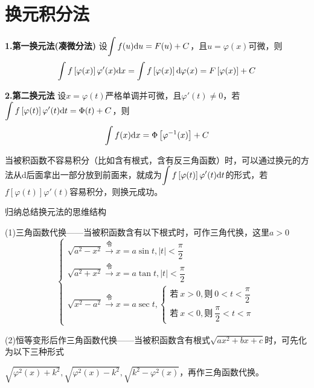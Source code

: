\section{换元积分法}
\textbf{1.第一换元法(凑微分法)} \quad 设$\displaystyle\int f(u)\mathrm{d} u=F(u)+C$，且$u=\varphi(x)$可微，则
\begin{equation}
    \int f\left[\varphi(x)\right]\varphi'(x)\mathrm{d} x=\int f\left[\varphi(x)\right]\mathrm{d}\varphi(x)=F\left[\varphi(x)\right]+C
    \nonumber
\end{equation}

\textbf{2.第二换元法} \quad 设$x=\varphi(t)$严格单调并可微，且$\varphi'(t)\neq0$，若$\displaystyle\int f\left[\varphi(t)\right]\varphi'(t)\mathrm{d} t=\Phi(t)+C$，则
\begin{equation}
    \int f(x)\mathrm{d} x=\Phi\left[\varphi^{-1}(x)\right]+C
    \nonumber
\end{equation}

当被积函数不容易积分（比如含有根式，含有反三角函数）时，可以通过换元的方法从d后面拿出一部分放到前面来，就成为$\displaystyle\int f\left[\varphi(t)\right]\varphi'(t)\mathrm{d} t$的形式，若$f\left[\varphi(t)\right]\varphi'(t)$容易积分，则换元成功。

归纳总结换元法的思维结构

(1)三角函数代换——当被积函数含有以下根式时，可作三角代换，这里$a>0$
\begin{equation}
    \begin{cases}
        \sqrt{a^2-x^2}\xrightarrow{\mbox{令}}x=a\sin t,\left|t\right|<\dfrac{\pi}{2} \\
        \sqrt{a^2+x^2}\xrightarrow{\mbox{令}}x=a\tan t,\left|t\right|<\dfrac{\pi}{2} \\
        \sqrt{x^2-a^2}\xrightarrow{\mbox{令}}x=a\sec t,
        \begin{cases}
            \mbox{若}\ x>0,\mbox{则}\ 0<t<\dfrac{\pi}{2} \\
            \mbox{若}\ x<0,\mbox{则}\ \dfrac{\pi}{2}<t<\pi
        \end{cases}
    \end{cases}\nonumber
\end{equation}
\vspace{2mm}

(2)恒等变形后作三角函数代换——当被积函数含有根式$\sqrt{ax^2+bx+c}$时，可先化为以下三种形式

$\sqrt{\varphi^2(x)+k^2},\sqrt{\varphi^2(x)-k^2},\sqrt{k^2-\varphi^2(x)}$，再作三角函数代换。
\vspace{2mm}

